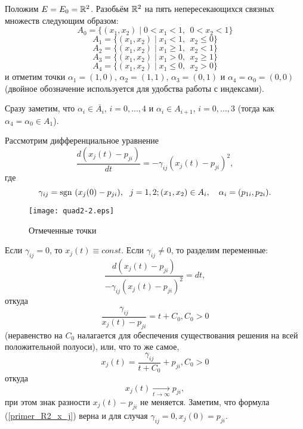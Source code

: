 Положим $E=E_0=\mathbb{R}^2$.
Разобьём $\mathbb{R}^2$ на пять непересекающихся связных множеств следующим образом:
$$
	A_0 = \{ (x_1, x_2) \mid 0 < x_1 < 1,~~ 0 < x_2 < 1\}
$$
$$
	A_1 = \{ (x_1, x_2) \mid x_1 < 1,~~ x_2 \leq 0  \}
$$
$$
	A_2 = \{ (x_1, x_2) \mid x_1 \geq 1,~~ x_2 < 1  \}
$$
$$
	A_3 = \{ (x_1, x_2) \mid x_1 > 0,~~ x_2 \geq 1  \}
$$
$$
	A_4 = \{ (x_1, x_2) \mid x_1 \leq 0,~~ x_2 > 0  \}
$$
и отметим точки
$\alpha_1=(1, 0)$,
$\alpha_2=(1, 1)$,
$\alpha_3=(0, 1)$ и
$\alpha_4=\alpha_0=(0, 0)$
(двойное обозначение используется для удобства работы с индексами).

Сразу заметим, что $\alpha_i \in \overline{A_i}$, $i=0,...,4$ и
$\alpha_i \in A_{i+1}$, $i=0,...,3$ (тогда как $\alpha_4 = \alpha_0 \in A_{1}$).


Рассмотрим дифференциальное уравнение
\begin{equation}\label{difur_primer_R2}
	\frac{d(x_j(t) - p_{ji})}{dt} = -\gamma_{ij}(x_j(t)-p_{ji})^2,
\end{equation}
где
$$
	\gamma_{ij} = \mathrm{sgn}~(x_j(0)-p_{ji}),~~j=1,2;
	(x_1, x_2) \in A_i, ~~~ \alpha_i = (p_{1i},p_{2i}).
$$

\begin{wrapfigure}[28]{r}{7.5cm}
	\texttt{[image: quad2-2.eps]}
	\caption{Отмеченные точки}
	\label{fig:somelabel2}
\end{wrapfigure}

Если $\gamma_{ij} = 0$, то $x_j(t) \equiv const$.
Если $\gamma_{ij} \neq 0$, то разделим переменные:
\begin{equation*}
	\frac{d(x_j(t) - p_{ji})}{-\gamma_{ij}(x_j(t)-p_{ji})^2} = dt ,
\end{equation*}
откуда
\begin{equation*}
	\frac{\gamma_{ij}}{x_j(t)-p_{ji}} = t+C_0, C_0 > 0
\end{equation*}
(неравенство на $C_0$ налагается для обеспечения существования решения на всей положительной полуоси),
или, что то же самое,
\begin{equation}\label{primer_R2_x_j}
	x_j(t) = \frac{\gamma_{ij}}{t+C_0}+p_{ji}, C_0 > 0
\end{equation}
откуда
\begin{equation*}
	x_j(t) \xrightarrow[t\to \infty ]{}{p_{ji}},
\end{equation*}
при этом знак разности $x_j(t) - p_{ji}$ не меняется.
Заметим, что формула (\ref{primer_R2_x_j}) верна и для случая $\gamma_{ij}=0, x_j(0)=p_{ji}$.

